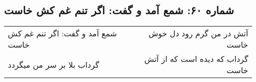 \begin{center}
\section*{شماره ۶۰: شمع آمد و گفت: اگر تنم غم کش خاست}
\label{sec:060}
\begin{longtable}{l p{0.5cm} r}
شمع آمد و گفت: اگر تنم غم کش خاست
&&
آتش در من گرم رود دل خوش خاست
\\
گرداب بلا بر سر من میگردد
&&
گرداب که دیده است که از آتش خاست
\\
\end{longtable}
\end{center}
